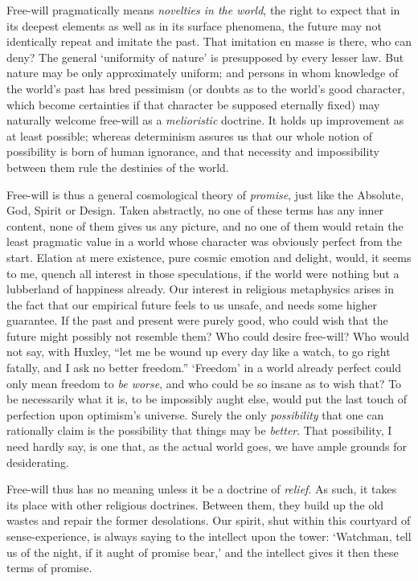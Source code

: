 \documentclass[]{article}
\begin{document}
Free-will pragmatically means \emph{novelties in the world}, the right to expect that in its deepest elements as well as in its surface phenomena, the future may not identically repeat and imitate the past. That imitation en masse is there, who can deny? The general `uniformity of nature' is presupposed by every lesser law. But nature may be only approximately uniform; and persons in whom knowledge of the world's past has bred pessimism (or doubts as to the world's good character, which become certainties if that character be supposed eternally fixed) may naturally welcome free-will as a \emph{melioristic} doctrine. It holds up improvement as at least possible; whereas determinism assures us that our whole notion of possibility is born of human ignorance, and that necessity and impossibility between them rule the destinies of the world.

Free-will is thus a general cosmological theory of \emph{promise}, just like the Absolute, God, Spirit or Design. Taken abstractly, no one of these terms has any inner content, none of them gives us any picture, and no one of them would retain the least pragmatic value in a world whose character was obviously perfect from the start. Elation at mere existence, pure cosmic emotion and delight, would, it seems to me, quench all interest in those speculations, if the world were nothing but a lubberland of happiness already. Our interest in religious metaphysics arises in the fact that our empirical future feels to us unsafe, and needs some higher guarantee. If the past and present were purely good, who could wish that the future might possibly not resemble them? Who could desire free-will? Who would not say, with Huxley, ``let me be wound up every day like a watch, to go right fatally, and I ask no better freedom.'' `Freedom' in a world already perfect could only mean freedom to \emph{be worse}, and who could be so insane as to wish that? To be necessarily what it is, to be impossibly aught else, would put the last touch of perfection upon optimism's universe. Surely the only \emph{possibility} that one can rationally claim is the possibility that things may be \emph{better}. That possibility, I need hardly say, is one that, as the actual world goes, we have ample grounds for desiderating.

Free-will thus has no meaning unless it be a doctrine of \emph{relief}. As such, it takes its place with other religious doctrines. Between them, they build up the old wastes and repair the former desolations. Our spirit, shut within this courtyard of sense-experience, is always saying to the intellect upon the tower: `Watchman, tell us of the night, if it aught of promise bear,' and the intellect gives it then these terms of promise.
\end{document}
